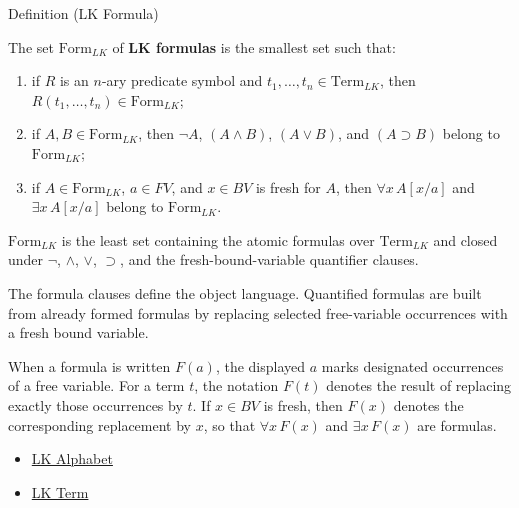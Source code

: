 \begin{definitionbox}{Definition (LK Formula)}
\begin{definition}[LK Formula]\label{def:lk-formula}
The set $\mathrm{Form}_{LK}$ of \textbf{LK formulas} is the smallest set
such that:
\begin{enumerate}
  \item if $R$ is an $n$-ary predicate symbol and
        $t_1,\ldots,t_n \in \mathrm{Term}_{LK}$, then
        $R(t_1,\ldots,t_n) \in \mathrm{Form}_{LK}$;
  \item if $A,B \in \mathrm{Form}_{LK}$, then
        $\lnot A$, $(A \land B)$, $(A \lor B)$, and
        $(A \supset B)$ belong to $\mathrm{Form}_{LK}$;
  \item if $A \in \mathrm{Form}_{LK}$, $a \in FV$, and
        $x \in BV$ is fresh for $A$, then
        $\forall x\,A[x/a]$ and $\exists x\,A[x/a]$ belong to
        $\mathrm{Form}_{LK}$.
\end{enumerate}
\end{definition}
\end{definitionbox}

\begin{remark*}
$\mathrm{Form}_{LK}$ is the least set containing the atomic formulas over
$\mathrm{Term}_{LK}$ and closed under $\lnot$, $\land$, $\lor$, $\supset$,
and the fresh-bound-variable quantifier clauses.
\end{remark*}

\begin{remark*}[Interpretation]
The formula clauses define the object language. Quantified formulas are built
from already formed formulas by replacing selected free-variable occurrences
with a fresh bound variable.
\end{remark*}

\begin{remark*}[Exposition]
When a formula is written $F(a)$, the displayed $a$ marks designated
occurrences of a free variable. For a term $t$, the notation $F(t)$ denotes
the result of replacing exactly those occurrences by $t$. If $x \in BV$ is
fresh, then $F(x)$ denotes the corresponding replacement by $x$, so that
$\forall x\,F(x)$ and $\exists x\,F(x)$ are formulas.
\end{remark*}

\begin{dependencies}
\begin{itemize}
  \item \hyperref[def:lk-alphabet]{LK Alphabet}
  \item \hyperref[def:lk-term]{LK Term}
\end{itemize}
\end{dependencies}


